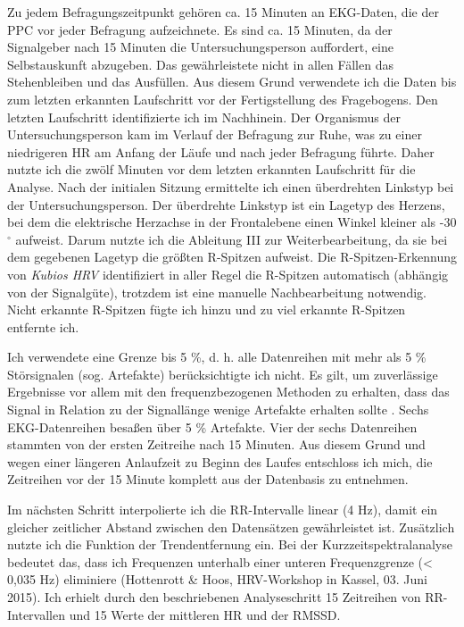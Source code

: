 Zu jedem Befragungszeitpunkt gehören ca. 15 Minuten an \ac{EKG}-Daten, die der \ac{PPC} vor jeder Befragung aufzeichnete. Es sind ca. 15 Minuten, da der Signalgeber nach 15 Minuten die Untersuchungsperson auffordert, eine Selbstauskunft abzugeben. Das gewährleistete nicht in allen Fällen das Stehenbleiben und das Ausfüllen. Aus diesem Grund verwendete ich die Daten bis zum letzten erkannten Laufschritt vor der Fertigstellung des Fragebogens. Den letzten Laufschritt identifizierte ich im Nachhinein. Der Organismus der Untersuchungsperson kam im Verlauf der Befragung zur Ruhe, was zu einer niedrigeren \ac{HR} am Anfang der Läufe und nach jeder Befragung führte. Daher nutzte ich die zwölf Minuten vor dem letzten erkannten Laufschritt für die Analyse. Nach der initialen Sitzung ermittelte ich einen überdrehten Linkstyp bei der Untersuchungsperson. Der überdrehte Linkstyp ist ein Lagetyp des Herzens, bei dem die elektrische Herzachse in der Frontalebene einen Winkel kleiner als -30 $^{\circ}$ aufweist. Darum nutzte ich die Ableitung III zur Weiterbearbeitung, da sie bei dem gegebenen Lagetyp die größten R-Spitzen aufweist. Die R-Spitzen-Erkennung von \emph{Kubios HRV} identifiziert in aller Regel die R-Spitzen automatisch (abhängig von der Signalgüte), trotzdem ist eine manuelle Nachbearbeitung notwendig. Nicht erkannte R-Spitzen fügte ich hinzu und zu viel erkannte R-Spitzen entfernte ich.

Ich verwendete eine Grenze bis 5 \%, d. h. alle Datenreihen mit mehr als 5 \% Störsignalen (sog. Artefakte) berücksichtigte ich nicht. Es gilt, um zuverlässige Ergebnisse vor allem mit den frequenzbezogenen Methoden zu erhalten, dass das Signal in Relation zu der Signallänge wenige Artefakte erhalten sollte \citep[z. B. < 5 - 10 \%; vgl. ][S.~77]{Sammito2015}. Sechs \ac{EKG}-Datenreihen besaßen über 5 \% Artefakte. Vier der sechs Datenreihen stammten von der ersten Zeitreihe nach 15 Minuten. Aus diesem Grund und wegen einer längeren Anlaufzeit zu Beginn des Laufes entschloss ich mich, die Zeitreihen vor der 15 Minute komplett aus der Datenbasis zu entnehmen.

Im nächsten Schritt interpolierte ich die RR-Intervalle linear (4 Hz), damit ein gleicher zeitlicher Abstand zwischen den Datensätzen gewährleistet ist. Zusätzlich nutzte ich die Funktion der Trendentfernung ein. Bei der Kurzzeitspektralanalyse bedeutet das, dass ich Frequenzen unterhalb einer unteren Frequenzgrenze (< 0,035 Hz) eliminiere (Hottenrott \& Hoos, \ac{HRV}-Workshop in Kassel, 03. Juni 2015). Ich erhielt durch den beschriebenen Analyseschritt 15 Zeitreihen von RR-Intervallen und 15 Werte der mittleren \ac{HR} und der \acs{RMSSD}.

